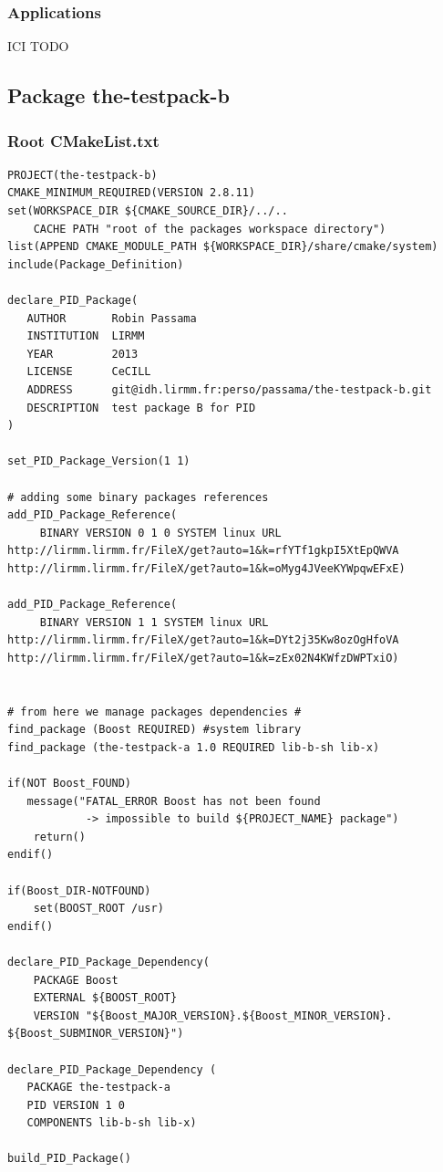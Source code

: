 \documentclass[12pt,a4paper]{article}
\begin{document}
\subsubsection{Applications}

ICI TODO

\subsection{Package the-testpack-b}

\subsubsection{Root CMakeList.txt}

\begin{verbatim}
PROJECT(the-testpack-b)
CMAKE_MINIMUM_REQUIRED(VERSION 2.8.11)
set(WORKSPACE_DIR ${CMAKE_SOURCE_DIR}/../.. 
	CACHE PATH "root of the packages workspace directory")
list(APPEND CMAKE_MODULE_PATH ${WORKSPACE_DIR}/share/cmake/system)
include(Package_Definition)

declare_PID_Package(	
   AUTHOR       Robin Passama 
   INSTITUTION  LIRMM 
   YEAR         2013 
   LICENSE      CeCILL
   ADDRESS      git@idh.lirmm.fr:perso/passama/the-testpack-b.git
   DESCRIPTION  test package B for PID
)

set_PID_Package_Version(1 1)

# adding some binary packages references
add_PID_Package_Reference(	
     BINARY VERSION 0 1 0 SYSTEM linux URL 	
http://lirmm.lirmm.fr/FileX/get?auto=1&k=rfYTf1gkpI5XtEpQWVA
http://lirmm.lirmm.fr/FileX/get?auto=1&k=oMyg4JVeeKYWpqwEFxE)

add_PID_Package_Reference(
     BINARY VERSION 1 1 SYSTEM linux URL 	
http://lirmm.lirmm.fr/FileX/get?auto=1&k=DYt2j35Kw8ozOgHfoVA
http://lirmm.lirmm.fr/FileX/get?auto=1&k=zEx02N4KWfzDWPTxiO)


# from here we manage packages dependencies #
find_package (Boost REQUIRED) #system library
find_package (the-testpack-a 1.0 REQUIRED lib-b-sh lib-x)

if(NOT Boost_FOUND)
   message("FATAL_ERROR Boost has not been found 
            -> impossible to build ${PROJECT_NAME} package")
	return()
endif()

if(Boost_DIR-NOTFOUND)
	set(BOOST_ROOT /usr)
endif()

declare_PID_Package_Dependency(
    PACKAGE Boost 
    EXTERNAL ${BOOST_ROOT} 
    VERSION "${Boost_MAJOR_VERSION}.${Boost_MINOR_VERSION}.
${Boost_SUBMINOR_VERSION}")

declare_PID_Package_Dependency (
   PACKAGE the-testpack-a
   PID VERSION 1 0 
   COMPONENTS lib-b-sh lib-x)

build_PID_Package()

\end{verbatim}
\end{document}
